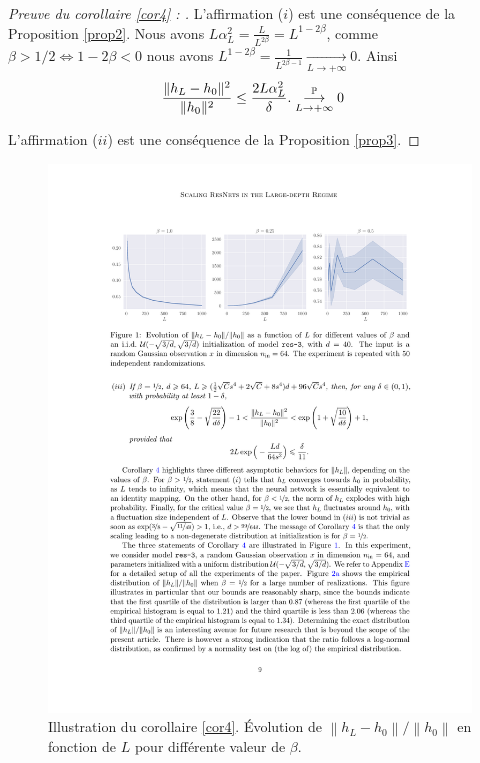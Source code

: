 \begin{proof}[Preuve du corollaire \ref{cor4} : ]
    L'affirmation ($ i $) est une conséquence de la Proposition \ref{prop2}. Nous avons $ L \alpha _L ^2 = \frac{L}{L^{2\beta} } = L^{1 - 2 \beta } $, comme $ \beta > 1/2 \Leftrightarrow 1 - 2 \beta < 0 $ nous avons $ L^{1 - 2 \beta } = \frac{1}{L^{2 \beta  -1}} \underset{L\to +\infty}{\longrightarrow} 0 $. Ainsi
    \begin{align*}
        & \frac{\|h_L - h_0\|^2}{\|h_0\|^2} \leq \frac{2L\alpha_L^2}{\delta}.
        \overunderset{\mathbb{P}}{L\to +\infty}{\longrightarrow} 0 
    \end{align*}

    L'affirmation ($ ii $) est une conséquence de la Proposition \ref{prop3}.
\end{proof}

\begin{figure}[htbp]
    \centering
    \includegraphics[width=.95\textwidth]{figs/figure_cor4.pdf}
    \caption{Illustration du corollaire \ref{cor4}. Évolution de $ \left\| h_L - h_0 \right\| / \left\| h_0 \right\| $ en fonction de $ L $ pour différente valeur de $ \beta  $.}
    \label{fig:cor4}
\end{figure}